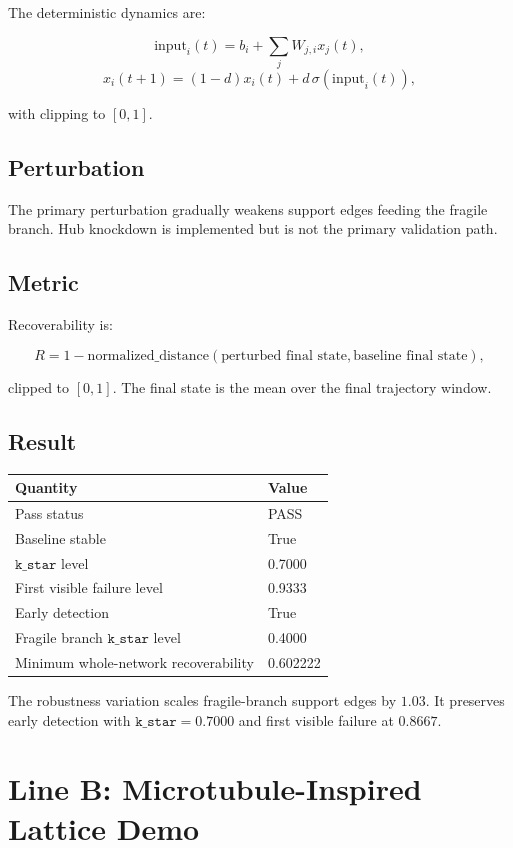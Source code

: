 \documentclass[11pt]{article}
\begin{document}
The deterministic dynamics are:

\[
\text{input}_i(t)=b_i+\sum_j W_{j,i}x_j(t),
\]
\[
x_i(t+1)=(1-d)x_i(t)+d\,\sigma(\text{input}_i(t)),
\]

with clipping to \([0,1]\).

\subsection{Perturbation}

The primary perturbation gradually weakens support edges feeding the fragile branch. Hub knockdown is implemented but is not the primary validation path.

\subsection{Metric}

Recoverability is:

\[
R=1-\text{normalized\_distance}(\text{perturbed final state},\text{baseline final state}),
\]

clipped to \([0,1]\). The final state is the mean over the final trajectory window.

\subsection{Result}

\begin{center}
\begin{tabular}{ll}
\toprule
Quantity & Value \\
\midrule
Pass status & PASS \\
Baseline stable & True \\
\(\texttt{k\_star}\) level & 0.7000 \\
First visible failure level & 0.9333 \\
Early detection & True \\
Fragile branch \(\texttt{k\_star}\) level & 0.4000 \\
Minimum whole-network recoverability & 0.602222 \\
\bottomrule
\end{tabular}
\end{center}

The robustness variation scales fragile-branch support edges by \(1.03\). It preserves early detection with \(\texttt{k\_star}=0.7000\) and first visible failure at \(0.8667\).

\section{Line B: Microtubule-Inspired Lattice Demo}
\end{document}
